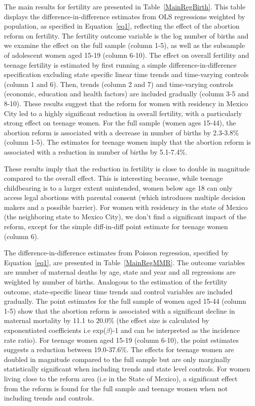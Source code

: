 \documentclass[a4paper, 11pt]{article}
\begin{document}
\begin{spacing}{2}
The main results for fertility are presented in Table~\ref{MainRegBirth}. This table displays the difference-in-difference estimates from OLS regressions weighted by population, as specified in Equation~\eqref{eq1}, reflecting the effect of the abortion reform on fertility. The fertility outcome variable is the log number of births and we examine the effect on the full sample (column 1-5), as well as the subsample of adolescent women aged 15-19 (column 6-10). The effect on overall fertility and teenage fertility is estimated by first running a simple difference-in-difference specification excluding state specific linear time trends and time-varying controls (column 1 and 6). Then, trends (column 2 and 7) and time-varying controls (economic, education and health factors) are included gradually (column 3-5 and 8-10). These results suggest that the reform for women with residency in Mexico City led to a highly significant reduction in overall fertility, with a particularly strong effect on teenage women. For the full sample (women ages 15-44), the abortion reform is associated with a decrease in number of births by 2.3-3.8\% (column 1-5). The estimates for teenage women imply that the abortion reform is associated with a reduction in number of births by 5.1-7.4\%. 

These results imply that the reduction in fertility is close to double in magnitude compared to the overall effect. This is interesting because, while teenage childbearing is to a larger extent unintended, women below age 18 can only access legal abortions with parental consent (which introduces multiple decision makers and a possible barrier). For women with residency in the state of Mexico (the neighboring state to Mexico City), we don't find a significant impact of the reform, except for the simple diff-in-diff point estimate for teenage women (column 6). 

The difference-in-difference estimates from Poisson regression, specified by Equation~\eqref{eq1}, are presented in Table~\ref{MainRegMMR}. The outcome variables are number of maternal deaths by age, state and year and all regressions are weighted by number of births. Analogous to the estimation of the fertility outcome, state-specific linear time trends and control variables are included gradually. The point estimates for the full sample of women aged 15-44 (column 1-5) show that the abortion reform is associated with a significant decline in maternal mortality by 11.1 to 20.0\% (the effect size is calculated by exponentiated coefficients i.e exp($\beta$)-1 and can be interpreted as the incidence rate ratio). For teenage women aged 15-19 (column 6-10), the point estimates suggests a reduction between 19.0-37.6\%. The effects for teenage women are doubled in magnitude compared to the full sample but are only marginally statistically significant when including trends and state level controls. For women living close to the reform area (i.e in the State of Mexico), a significant effect from the reform is found for the full sample and teenage women when not including trends and controls.  


\end{spacing}
\end{document}

